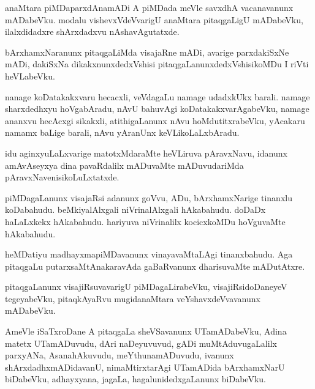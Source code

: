 \documentclass{article}
\begin{document}
\begin{mn}%
anaMtara piMDaparxdAnamADi A piMDada meVle savxdhA vacanavanunx
mADabeVku. modalu vishevxVdeVvarigU anaMtara pitaqgaLigU mADabeVku,
ilalxdidadxre shArxdadxvu nAshavAgutatxde.
\end{mn}

\begin{mn}
bArxhamxNaranunx pitaqgaLiMda visajaRne mADi, avarige parxdakiSxNe
mADi, dakiSxNa dikakxnunxdedxVshisi pitaqgaLanunxdedxVshisikoMDu I
riVti heVLabeVku.
\end{mn}

\begin{mn}%
nanage koDatakakxvaru hecacxli, veVdagaLu namage udadxkUkx
barali. namage sharxdedhxyu hoVgabAradu, nAvU bahuvAgi
koDatakakxvarAgabeVku, namage ananxvu hecAcxgi sikakxli,
atithigaLanunx nAvu hoMdutitxrabeVku, yAcakaru namamx baLige barali,
nAvu yAranUnx keVLikoLaLxbAradu.
\end{mn}

\begin{mn}
idu aginxyuLaLxvarige matotxMdaraMte heVLiruva pAravxNavu, idanunx
amAvAseyxya dina pavaRdalilx mADuvaMte mADuvudariMda pAravxNavenisikoLuLxtatxde.
\end{mn}

\begin{mn}%
piMDagaLanunx visajaRsi adanunx goVvu, ADu, bArxhamxNarige tinanxlu
koDabahudu. beMkiyalAlxgali niVrinalAlxgali hAkabahudu. doDaDx
haLaLxkekx hAkabahudu. hariyuva niVrinalilx kocicxkoMDu hoVguvaMte hAkabahudu.
\end{mn}

\begin{mn}
heMDatiyu madhayxmapiMDavanunx vinayavaMtaLAgi tinanxbahudu. Aga
pitaqgaLu putarxsaMtAnakaravAda gaBaRvanunx dharisuvaMte mADutAtxre.
\end{mn}

\begin{mn}
pitaqgaLanunx visajiRsuvavarigU piMDagaLirabeVku, visajiRsidoDaneyeV
tegeyabeVku, pitaqkAyaRvu mugidanaMtara veYshavxdeVvavanunx mADabeVku.
\end{mn}

\begin{mn}%
AmeVle iSaTxroDane A pitaqgaLa sheVSavanunx UTamADabeVku, Adina matetx
UTamADuvudu, dAri naDeyuvuvud, gADi muMtAduvugaLalilx parxyANa,
AsanahAkuvudu, meYthunamADuvudu, ivanunx shArxdadhxmADidavanU,
nimaMtirxtarAgi UTamADida bArxhamxNarU biDabeVku, adhayxyana, jagaLa,
hagalunidedxgaLanunx biDabeVku.
\end{mn}
\end{document}
